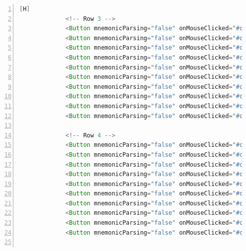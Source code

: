 \documentclass{article}
\begin{document}
\begin{lstlisting}[language=java,caption={Archivo FXML}, numbers=left][H]
             <!-- Row 3 -->
             <Button mnemonicParsing="false" onMouseClicked="#onButtonClick" styleClass="button" text="" GridPane.columnIndex="0" GridPane.rowIndex="3" />
             <Button mnemonicParsing="false" onMouseClicked="#onButtonClick" styleClass="button" text="" GridPane.columnIndex="1" GridPane.rowIndex="3" />
             <Button mnemonicParsing="false" onMouseClicked="#onButtonClick" styleClass="button" text="" GridPane.columnIndex="2" GridPane.rowIndex="3" />
             <Button mnemonicParsing="false" onMouseClicked="#onButtonClick" styleClass="button" text="" GridPane.columnIndex="3" GridPane.rowIndex="3" />
             <Button mnemonicParsing="false" onMouseClicked="#onButtonClick" styleClass="button" text="" GridPane.columnIndex="4" GridPane.rowIndex="3" />
             <Button mnemonicParsing="false" onMouseClicked="#onButtonClick" styleClass="button" text="" GridPane.columnIndex="5" GridPane.rowIndex="3" />
             <Button mnemonicParsing="false" onMouseClicked="#onButtonClick" styleClass="button" text="" GridPane.columnIndex="6" GridPane.rowIndex="3" />
             <Button mnemonicParsing="false" onMouseClicked="#onButtonClick" styleClass="button" text="" GridPane.columnIndex="7" GridPane.rowIndex="3" />
             <Button mnemonicParsing="false" onMouseClicked="#onButtonClick" styleClass="button" text="" GridPane.columnIndex="8" GridPane.rowIndex="3" />
             <Button mnemonicParsing="false" onMouseClicked="#onButtonClick" styleClass="button" text="" GridPane.columnIndex="9" GridPane.rowIndex="3" />

             <!-- Row 4 -->
             <Button mnemonicParsing="false" onMouseClicked="#onButtonClick" styleClass="button" text="" GridPane.columnIndex="0" GridPane.rowIndex="4" />
             <Button mnemonicParsing="false" onMouseClicked="#onButtonClick" styleClass="button" text="" GridPane.columnIndex="1" GridPane.rowIndex="4" />
             <Button mnemonicParsing="false" onMouseClicked="#onButtonClick" styleClass="button" text="" GridPane.columnIndex="2" GridPane.rowIndex="4" />
             <Button mnemonicParsing="false" onMouseClicked="#onButtonClick" styleClass="button" text="" GridPane.columnIndex="3" GridPane.rowIndex="4" />
             <Button mnemonicParsing="false" onMouseClicked="#onButtonClick" styleClass="button" text="" GridPane.columnIndex="4" GridPane.rowIndex="4" />
             <Button mnemonicParsing="false" onMouseClicked="#onButtonClick" styleClass="button" text="" GridPane.columnIndex="5" GridPane.rowIndex="4" />
             <Button mnemonicParsing="false" onMouseClicked="#onButtonClick" styleClass="button" text="" GridPane.columnIndex="6" GridPane.rowIndex="4" />
             <Button mnemonicParsing="false" onMouseClicked="#onButtonClick" styleClass="button" text="" GridPane.columnIndex="7" GridPane.rowIndex="4" />
             <Button mnemonicParsing="false" onMouseClicked="#onButtonClick" styleClass="button" text="" GridPane.columnIndex="8" GridPane.rowIndex="4" />
             <Button mnemonicParsing="false" onMouseClicked="#onButtonClick" styleClass="button" text="" GridPane.columnIndex="9" GridPane.rowIndex="4" />


\end{lstlisting}
\end{document}
